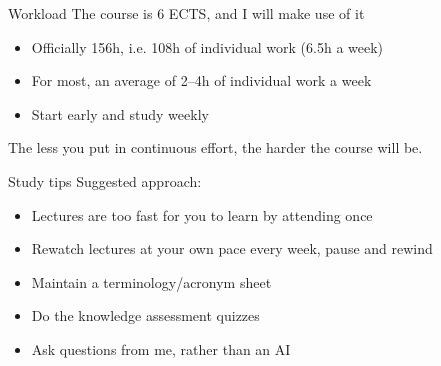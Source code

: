 \begin{frame}{Workload}
  The course is 6 ECTS, and I will make use of it
  \begin{itemize}[<+(1)->]
    \item Officially 156h, i.e. 108h of individual work (\approx 6.5h a week)
    \item For most, an average of 2--4h of individual work a week
    \item Start early and study weekly
  \end{itemize}

  \vspace*{1em}

  \pause
  The less you put in continuous effort, the harder the course will be.
\end{frame}

\begin{frame}{Study tips}
  Suggested approach:
  \begin{itemize}[<+(1)->]
    \item Lectures are too fast for you to learn by attending once
    \item Rewatch lectures at your own pace every week, pause and rewind
    \item Maintain a terminology/acronym sheet
    \item Do the knowledge assessment quizzes
    \item Ask questions from me, rather than an AI
  \end{itemize}
\end{frame}

